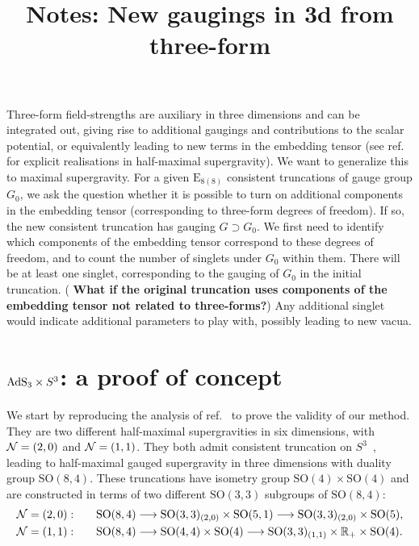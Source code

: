 \documentclass[11pt]{article}
\title{Notes: New gaugings in 3d from three-form}
\author{}
\newcommand{\SO}{\ensuremath{\mathrm{SO}}\xspace}
\newcommand{\E}{\ensuremath{\mathrm{E}}\xspace}
\newcommand{\R}{\ensuremath{\mathbb{R}}\xspace}
\newcommand{\ce}[1]{\marginpar{\parbox{\marginparwidth}{\boldmath $\Longleftarrow$}}
{\boldmath\bfseries #1}}
\begin{document}
\maketitle

Three-form field-strengths are auxiliary in three dimensions and can be integrated out, giving rise to additional gaugings and contributions to the scalar potential, or equivalently leading to new terms in the embedding tensor (see ref.~\cite{Deger:2014ofa,Eloy:2021fhc} for explicit realisations in half-maximal supergravity). We want to generalize this to maximal supergravity. For a given $\E_{8(8)}$ consistent truncations of gauge group $G_{0}$, we ask the question whether it is possible to turn on additional components in the embedding tensor (corresponding to three-form degrees of freedom). If so, the new consistent truncation has gauging $G\supset G_{0}$. We first need to identify which components of the embedding tensor correspond to these degrees of freedom, and to count the number of singlets under $G_{0}$ within them. There will be at least one singlet, corresponding to the gauging of $G_{0}$ in the initial truncation. (\ce{What if the original truncation uses components of the embedding tensor not related to three-forms?}) Any additional singlet would indicate additional parameters to play with, possibly leading to new vacua.

\section{\texorpdfstring{${\rm AdS}_{3}\times S^{3}$}{AdS3xS3}: a proof of concept}
We start by reproducing the analysis of ref.~\cite{Eloy:2021fhc} to prove the validity of our method. They are two different half-maximal supergravities in six dimensions, with ${\cal N}=(2,0)$ and ${\cal N}=(1,1)$. They both admit consistent truncation on $S^{3}$~\cite{Hohm:2017wtr,Samtleben:2019zrh}, leading to half-maximal gauged supergravity in three dimensions with duality group $\SO(8,4)$. These truncations have isometry group $\SO(4)\times\SO(4)$ and are constructed in terms of two different $\SO(3,3)$ subgroups of $\SO(8,4)$:
\begin{subequations}
  \begin{align}
    {\cal N}=(2,0):&\qquad \SO(8,4)\longrightarrow\SO(3,3)_{(2,0)}\times \SO(5,1)\longrightarrow\SO(3,3)_{(2,0)}\times \SO(5), \label{eq:SO84decomp20}\\
    {\cal N}=(1,1):&\qquad \SO(8,4)\longrightarrow\SO(4,4)\times \SO(4)\longrightarrow\SO(3,3)_{(1,1)}\times\R_{+}\times\SO(4). \label{eq:SO84decomp11}
  \end{align}
\end{subequations}
\end{document}
